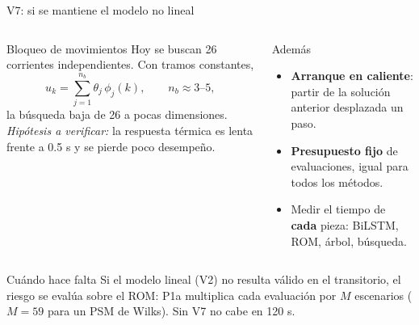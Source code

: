 \documentclass[aspectratio=169,10pt]{beamer}
\newcommand{\key}[1]{{\color{USMBlue}\bfseries #1}}
\begin{document}
\begin{frame}{V7: si se mantiene el modelo no lineal}
\begin{columns}[T]
\begin{block}{Bloqueo de movimientos}
Hoy se buscan 26 corrientes independientes. Con tramos constantes,
\[
u_k=\textstyle\sum_{j=1}^{n_b}\theta_j\,\phi_j(k),\qquad n_b\approx 3\text{--}5,
\]
la búsqueda baja de 26 a pocas dimensiones. \emph{Hipótesis a verificar:} la respuesta térmica es lenta frente a 0.5 s y se pierde poco desempeño.
\end{block}
\begin{block}{Además}
\begin{itemize}\setlength{\itemsep}{.1cm}
\item \key{Arranque en caliente}: partir de la solución anterior desplazada un paso.
\item \key{Presupuesto fijo} de evaluaciones, igual para todos los métodos.
\item Medir el tiempo de \key{cada} pieza: BiLSTM, ROM, árbol, búsqueda.
\end{itemize}
\end{block}
\end{columns}
\vspace{.1cm}
\begin{alertblock}{Cuándo hace falta}
Si el modelo lineal (V2) no resulta válido en el transitorio, el riesgo se evalúa sobre el ROM: P1a multiplica cada evaluación por $M$ escenarios ($M=59$ para un PSM de Wilks). Sin V7 no cabe en 120 s.
\end{alertblock}
\end{frame}
\end{document}
